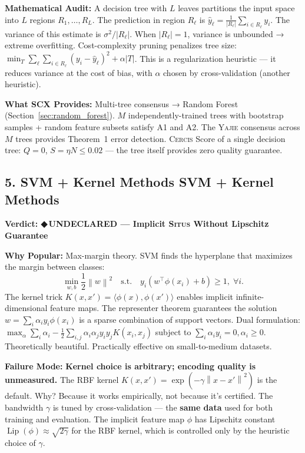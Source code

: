 \documentclass[12pt,a4paper]{article}
\theoremstyle{definition}
\newcommand{\guilty}{{\color{guiltycolor}\textbf{◆\,UNDECLARED}}}
\newcommand{\Situs}{\textsc{Situs}}
\newcommand{\Yajie}{\textsc{Yajie}}
\newcommand{\Cercis}{\textsc{Cercis}}
\DeclareMathOperator{\Lip}{Lip}
\newcommand{\norm}[1]{\left\lVert#1\right\rVert}
\newcommand{\inner}[2]{\langle #1, #2 \rangle}
\newcommand{\auditHeader}[1]{\medskip\noindent\textbf{\large #1}\medskip}
\newcommand{\whyPopular}{\noindent\textbf{Why Popular:} }
\newcommand{\whyFail}{\noindent\textbf{Failure Mode:} }
\newcommand{\whatMissing}{\noindent\textbf{What SCX Provides:} }
\newcommand{\mathAudit}{\noindent\textbf{Mathematical Audit:} }
\begin{document}
\mathAudit{} A decision tree with $L$ leaves partitions the input space into $L$ regions $R_1, \ldots, R_L$. The prediction in region $R_\ell$ is $\hat{y}_\ell = \frac{1}{|R_\ell|}\sum_{i \in R_\ell} y_i$. The variance of this estimate is $\sigma^2 / |R_\ell|$. When $|R_\ell| = 1$, variance is unbounded → extreme overfitting. Cost-complexity pruning penalizes tree size: $\min_{T} \sum_{\ell} \sum_{i \in R_\ell} (y_i - \hat{y}_\ell)^2 + \alpha |T|$. This is a regularization heuristic — it reduces variance at the cost of bias, with $\alpha$ chosen by cross-validation (another heuristic).

\whatMissing{} Multi-tree consensus → Random Forest (Section~\ref{sec:random_forest}). $M$ independently-trained trees with bootstrap samples + random feature subsets satisfy A1 and A2. The \Yajie{} consensus across $M$ trees provides Theorem~1 error detection. \Cercis{} Score of a single decision tree: $Q=0$, $S=\eta N \le 0.02$ — the tree itself provides zero quality guarantee.

\subsection{5. SVM + Kernel Methods SVM + Kernel Methods}

\auditHeader{Verdict: \guilty{} — Implicit \Situs{} Without Lipschitz Guarantee}

\whyPopular{} Max-margin theory. SVM finds the hyperplane that maximizes the margin between classes:
\[
\min_{w,b} \frac{1}{2}\norm{w}^2 \quad \text{s.t.} \quad y_i(w^\top \phi(x_i) + b) \ge 1, \; \forall i.
\]
The kernel trick $K(x, x') = \inner{\phi(x)}{\phi(x')}$ enables implicit infinite-dimensional feature maps. The representer theorem guarantees the solution $w = \sum_i \alpha_i y_i \phi(x_i)$ is a sparse combination of support vectors. Dual formulation: $\max_\alpha \sum_i \alpha_i - \frac{1}{2}\sum_{i,j}\alpha_i\alpha_j y_i y_j K(x_i, x_j)$ subject to $\sum_i \alpha_i y_i = 0, \alpha_i \ge 0$. Theoretically beautiful. Practically effective on small-to-medium datasets.

\whyFail{} \textbf{Kernel choice is arbitrary; encoding quality is unmeasured.} The RBF kernel $K(x, x') = \exp(-\gamma\norm{x-x'}^2)$ is the default. Why? Because it works empirically, not because it's certified. The bandwidth $\gamma$ is tuned by cross-validation — the \textbf{same data} used for both training and evaluation. The implicit feature map $\phi$ has Lipschitz constant $\Lip(\phi) \approx \sqrt{2\gamma}$ for the RBF kernel, which is controlled only by the heuristic choice of $\gamma$.
\end{document}
